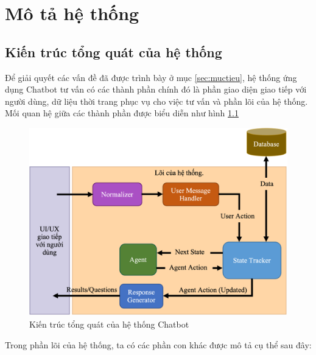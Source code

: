 \chapter{Mô tả hệ thống}

\section{Kiến trúc tổng quát của hệ thống}
Để giải quyết các vấn đề đã được trình bày ở mục \ref{sec:muctieu}, hệ thống ứng dụng Chatbot tư vấn có các thành phần chính đó là phần giao diện giao tiếp với người dùng, dữ liệu thời trang phục vụ cho việc tư vấn và phần lõi của hệ thống. Mối quan hệ giữa các thành phần được biểu diễn như hình \ref{fig:chatbotapp}

\begin{center}
    \begin{figure}[h!]
        \begin{center}
         \includegraphics[scale=0.95]{chapter4/img/chatbot_app.png}
        \end{center}
        \caption{Kiến trúc tổng quát của hệ thống Chatbot}
        \label{fig:chatbotapp}
    \end{figure}
\end{center}

Trong phần lõi của hệ thống, ta có các phần con khác được mô tả cụ thể sau đây:

